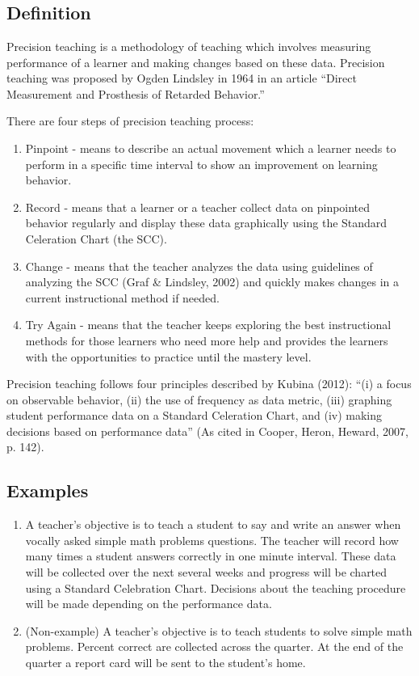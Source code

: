 \clearpage \section{\fourfFour{}}
\subsection{Definition}
Precision teaching is a methodology of teaching which involves measuring performance of a learner and making changes based on these data. Precision teaching was proposed by Ogden Lindsley in 1964 in an article ``Direct Measurement and Prosthesis of Retarded Behavior.'' 

There are four steps of precision teaching process: 
\begin{enumerate}
\item Pinpoint - means to describe an actual movement which a learner needs to perform in a specific time interval to show an improvement on learning behavior.
\item Record - means that a learner or a teacher collect data on pinpointed behavior regularly and display these data graphically using the Standard Celeration Chart (the SCC). 
\item Change - means that the teacher analyzes the data using guidelines of analyzing the SCC (Graf \& Lindsley, 2002) and quickly makes changes in a current instructional method if needed. 
\item Try Again - means that the teacher keeps exploring the best instructional methods for those learners who need more help and provides the learners with the opportunities to practice until the mastery level. 
\end{enumerate}

Precision teaching follows four principles described by Kubina (2012): ``(i) a focus on observable behavior, (ii) the use of frequency as data metric, (iii) graphing student performance data on a Standard Celeration Chart, and (iv) making decisions based on performance data'' (As cited in Cooper, Heron, Heward, 2007, p. 142).
%
\subsection{Examples}
\begin{enumerate}
\item A teacher's objective is to teach a student to say and write an answer when vocally asked simple math problems questions. The teacher will record how many times a student answers correctly in one minute interval. These data will be collected over the next several weeks and progress will be charted using a Standard Celebration Chart. Decisions about the teaching procedure will be made depending on the performance data.
\item (Non-example) A teacher's objective is to teach students to solve simple math problems.  Percent correct are collected across the quarter. At the end of the quarter a report card will be sent to the student's home.
\end{enumerate}
%
